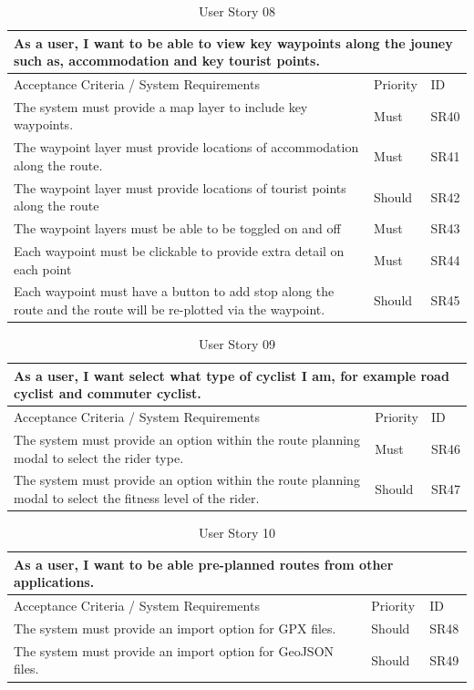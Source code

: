 \begin{table}[!htb]
  \caption{User Story 08}
  \label{tab:user-story-08}
  \begin{tabular}{ p{11cm} p{1cm}  p{1cm} }
  \hline
  \multicolumn{3}{p{13cm}}{As a user, I want to be able to view key waypoints along the jouney such as, accommodation and key tourist points.}\\ 
  \hline
  Acceptance Criteria / System Requirements & Priority & ID\\
  \hline
  The system must provide a map layer to include key waypoints. & Must & SR40 \\
  The waypoint layer must provide locations of accommodation along the route. & Must & SR41\\
  The waypoint layer must provide locations of tourist points along the route & Should & SR42\\
  The waypoint layers must be able to be toggled on and off & Must & SR43\\
  Each waypoint must be clickable to provide extra detail on each point & Must & SR44\\
  Each waypoint must have a button to add stop along the route and the route will be re-plotted via the waypoint. & Should & SR45\\
  \hline
  \end{tabular}
\end{table}

\begin{table}[!htb]
  \caption{User Story 09}
  \label{tab:user-story-09}
  \begin{tabular}{ p{11cm} p{1cm}  p{1cm} }
  \hline
  \multicolumn{3}{p{13cm}}{As a user, I want select what type of cyclist I am, for example road cyclist and commuter cyclist.}\\ 
  \hline
  Acceptance Criteria / System Requirements & Priority & ID\\
  \hline
  The system must provide an option within the route planning modal to select the rider type. & Must & SR46\\
  The system must provide an option within the route planning modal to select the fitness level of the rider. & Should & SR47\\
  \hline
  \end{tabular}
\end{table}

\begin{table}[!htb]
  \caption{User Story 10}
  \label{tab:user-story-10}
  \begin{tabular}{ p{11cm} p{1cm}  p{1cm} }
  \hline
  \multicolumn{3}{p{13cm}}{As a user, I want to be able pre-planned routes from other applications.}\\ 
  \hline
  Acceptance Criteria / System Requirements & Priority & ID\\
  \hline
  The system must provide an import option for GPX files. & Should & SR48\\
  The system must provide an import option for GeoJSON files. & Should & SR49\\
  \hline
  \end{tabular}
\end{table}

